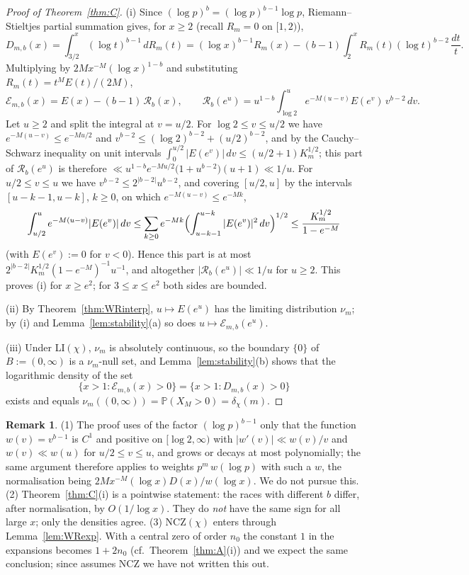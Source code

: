 \documentclass[11pt]{amsart}
\theoremstyle{definition}
\newtheorem{remark}[theorem]{Remark}
\numberwithin{equation}{section}
\newcommand{\PP}{\mathbb P}
\newcommand{\cE}{\mathcal E}
\begin{document}
\begin{proof}[Proof of Theorem~\ref{thm:C}]
(i) Since $(\log p)^b=(\log p)^{b-1}\log p$, Riemann--Stieltjes
partial summation gives, for $x\ge2$ (recall $R_m=0$ on $[1,2)$),
\[
D_{m,b}(x)=\int_{3/2}^x(\log t)^{b-1}\,dR_m(t)
=(\log x)^{b-1}R_m(x)-(b-1)\int_2^xR_m(t)(\log t)^{b-2}\,\frac{dt}{t}.
\]
Multiplying by $2Mx^{-M}(\log x)^{1-b}$ and substituting
$R_m(t)=t^ME(t)/(2M)$,
\begin{equation}\label{eq:Cdecomp}
\cE_{m,b}(x)=E(x)-(b-1)\,\mathcal R_b(x),
\qquad
\mathcal R_b(e^u)=u^{1-b}\int_{\log2}^ue^{-M(u-v)}E(e^v)\,v^{b-2}\,dv .
\end{equation}
Let $u\ge2$ and split the integral at $v=u/2$. For
$\log2\le v\le u/2$ we have $e^{-M(u-v)}\le e^{-Mu/2}$ and
$v^{b-2}\le(\log2)^{b-2}+(u/2)^{b-2}$, and by the Cauchy--Schwarz
inequality on unit intervals
$\int_0^{u/2}|E(e^v)|\,dv\le(u/2+1)K_m^{1/2}$; this part of
$\mathcal R_b(e^u)$ is therefore
$\ll u^{1-b}e^{-Mu/2}\bigl(1+u^{b-2}\bigr)(u+1)\ll1/u$. For
$u/2\le v\le u$ we have $v^{b-2}\le2^{|b-2|}u^{b-2}$, and covering
$[u/2,u]$ by the intervals $[u-k-1,u-k]$, $k\ge0$, on which
$e^{-M(u-v)}\le e^{-Mk}$,
\[
\int_{u/2}^ue^{-M(u-v)}|E(e^v)|\,dv
\le\sum_{k\ge0}e^{-Mk}\Bigl(\int_{u-k-1}^{u-k}|E(e^v)|^2\,dv\Bigr)^{1/2}
\le\frac{K_m^{1/2}}{1-e^{-M}}
\]
(with $E(e^v):=0$ for $v<0$). Hence this part is at most
$2^{|b-2|}K_m^{1/2}(1-e^{-M})^{-1}u^{-1}$, and altogether
$|\mathcal R_b(e^u)|\ll1/u$ for $u\ge2$. This proves (i) for
$x\ge e^2$; for $3\le x\le e^2$ both sides are bounded.

(ii) By Theorem~\ref{thm:WRinterp}, $u\mapsto E(e^u)$ has the limiting
distribution $\nu_m$; by (i) and Lemma~\ref{lem:stability}(a) so does
$u\mapsto\cE_{m,b}(e^u)$.

(iii) Under LI$(\chi)$, $\nu_m$ is absolutely continuous, so the
boundary $\{0\}$ of $B:=(0,\infty)$ is a $\nu_m$-null set, and
Lemma~\ref{lem:stability}(b) shows that the logarithmic density of
the set
\[
\{x>1:\cE_{m,b}(x)>0\}=\{x>1:D_{m,b}(x)>0\}
\]
exists and equals $\nu_m((0,\infty))=\PP(X_M>0)=\delta_\chi(m)$.
\end{proof}

\begin{remark}\label{rem:Cgeneral}
(1) The proof uses of the factor $(\log p)^{b-1}$ only that the
function $w(v)=v^{b-1}$ is $C^1$ and positive on $[\log2,\infty)$
with $|w'(v)|\ll w(v)/v$ and $w(v)\ll w(u)$ for $u/2\le v\le u$, and
grows or decays at most polynomially; the same argument therefore
applies to weights $p^m\,w(\log p)$ with such a $w$, the normalisation
being $2Mx^{-M}(\log x)D(x)/w(\log x)$. We do not pursue this.
(2) Theorem~\ref{thm:C}(i) is a pointwise statement: the races with
different $b$ differ, after normalisation, by $O(1/\log x)$. They do
\emph{not} have the same sign for all large $x$; only the densities
agree. (3) NCZ$(\chi)$ enters through Lemma~\ref{lem:WRexp}. With a
central zero of order $n_0$ the constant $1$ in the expansions becomes
$1+2n_0$ (cf.\ Theorem~\ref{thm:A}(i)) and we expect the same
conclusion; since \cite{WR} assumes NCZ we have not written this out.
\end{remark}
\end{document}
